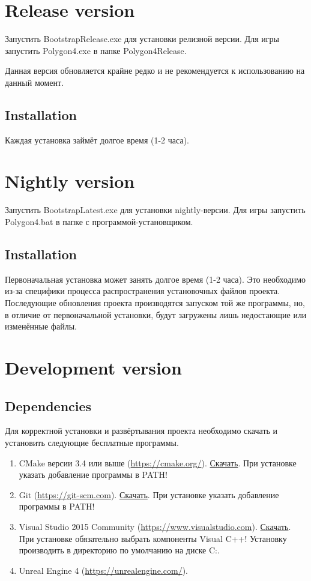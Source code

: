 \documentclass[a4paper,12pt]{report}
\begin{document}
\section{Release version}

Запустить BootstrapRelease.exe для установки релизной версии.
Для игры запустить Polygon4.exe в папке Polygon4Release.

Данная версия обновляется крайне редко и не рекомендуется к использованию на данный момент.

\subsection{Installation}

Каждая установка займёт долгое время (1-2 часа).

\section{Nightly version}

Запустить BootstrapLatest.exe для установки nightly-версии.
Для игры запустить Polygon4.bat в папке с программой-установщиком.

\subsection{Installation}

Первоначальная установка может занять долгое время (1-2 часа).
Это необходимо из-за специфики процесса распространения установочных файлов проекта.
Последующие обновления проекта производятся запуском той же программы, но, в отличие от первоначальной установки, будут загружены лишь недостающие или изменённые файлы.


\section{Development version}

\subsection{Dependencies}

Для корректной установки и развёртывания проекта необходимо скачать и установить следующие бесплатные программы.

\begin{enumerate}
\item CMake версии 3.4 или выше (\url{https://cmake.org/}).  \href{https://cmake.org/files/v3.4/cmake-3.4.0-win32-x86.exe}{Скачать}. При установке указать добавление программы в PATH!
\item Git (\url{https://git-scm.com}). \href{https://git-scm.com/download/win}{Скачать}. При установке указать добавление программы в PATH!
\item Visual Studio 2015 Community (\url{https://www.visualstudio.com}). \href{https://go.microsoft.com/fwlink/?LinkId=691978}{Скачать}. При установке обязательно выбрать компоненты Visual C++! Установку производить в директорию по умолчанию на диске C:.
\item Unreal Engine 4 (\url{https://unrealengine.com/}).
\end{enumerate}
\end{document}
